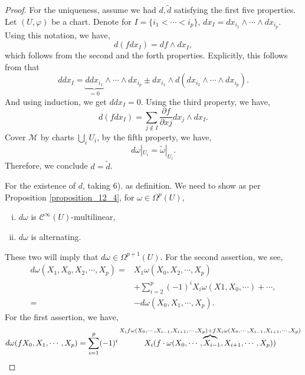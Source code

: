 \documentclass[8pt]{article}
\newcommand{\M}[0]{\mathcal{M}}
\newcommand{\cinf}[0]{\mathcal{C}^\infty}
\newcommand{\pd}[2]{{\frac {\partial #1} {\partial #2}}}
\begin{document}
\begin{proof}
  For the uniqueness, assume we had $d,\tilde{d}$ satisfying the first five properties. Let $(U,\varphi)$ be a chart. Denote for $I=\{i_1<\cdots<i_p\}$, $dx_{I} = dx_{i_1}\wedge\cdots\wedge dx_{i_p}$. 
  Using this notation, we have,
  \begin{equation*}
    d(fdx_I) = df\wedge dx_I,
  \end{equation*}
  which follows from the second and the forth properties. Explicitly, this follows from that 
  \begin{equation*}
    ddx_I = \underbrace{ddx_{i_1}}_{=0}\wedge\cdots\wedge dx_{i_p}\pm dx_{i_1}\wedge d(dx_{i_2}\wedge\cdots\wedge dx_{i_p}).
  \end{equation*}
  And using induction, we get $ddx_I=0$. Using the third property, we have,
  \begin{equation*}
    d(fdx_I) = \sum_{j\not\in I}\pd{f}{xj}dx_j\wedge dx_I.
  \end{equation*}
  Cover $\M$ by charts $\bigcup_{i}U_i$, by the fifth property, we have,
  \begin{equation*}
    d\omega|_{U_i} = \tilde{\omega}|_{U_i}.
  \end{equation*}
  Therefore, we conclude $d = \tilde{d}$.
  \par For the existence of $d$, taking 6). as definition. We need to show as per Proposition \ref{proposition_12_4}, for $\omega\in\Omega^p(U)$, 
  \begin{enumerate}[i).]
    \item $d\omega$ is $\cinf(U)$-multilinear,
    \item $d\omega$ is alternating.
  \end{enumerate}
  These two will imply that $d\omega\in\Omega^{p+1}(U)$. For the second assertion, we see,
  \begin{align*}
    d\omega(X_1,X_0,X_2,\cdots,X_p) =& X_1\omega(X_0,X_2,\cdots,X_p)\\
    &+\sum_{i=2}^p(-1)^iX_i\omega(X1,X_0,\cdots)+\cdots,\\
    =&  -d\omega(X_0,X_1,\cdots,X_p).
  \end{align*}
  For the first assertion, we have,
  \begin{align*}
    d\omega(fX_0,X_1,\cdots,X_p) & = \sum_{i=1}^p (-1)^i\overbrace{\mathmakebox[0pt][c]{X_i(f\cdot\omega(X_0,\cdots,X_{i-1},X_{i+1},\cdots,X_p))}}^{X_if\omega(X_0,\cdots,X_{i-1},X_{i+1},\cdots,X_p)+fX_i\omega(X_0,\cdots,X_{i-1},X_{i+1},\cdots,X_p)}\\

\end{align*}
\end{proof}
\end{document}
